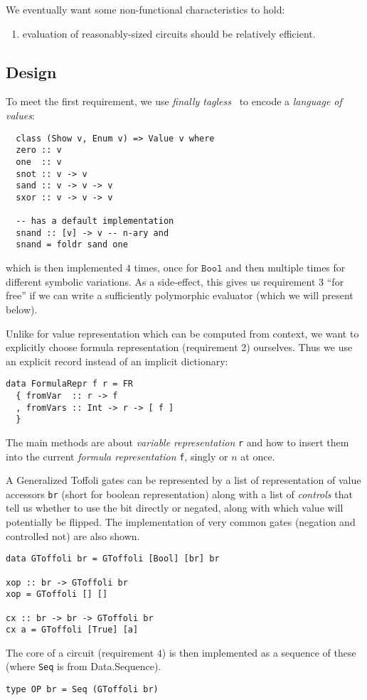 \documentclass[sigplan]{acmart}
\begin{document}
We eventually want some non-functional characteristics to hold:
\begin{enumerate}[resume]
  \item evaluation of reasonably-sized circuits should be relatively efficient.
\end{enumerate}

\subsection{Design}

To meet the first requirement, we use \emph{finally tagless}~\cite{tagless}
to encode a \emph{language of values}:
\begin{verbatim}
  class (Show v, Enum v) => Value v where
  zero :: v
  one  :: v
  snot :: v -> v
  sand :: v -> v -> v
  sxor :: v -> v -> v

  -- has a default implementation
  snand :: [v] -> v -- n-ary and
  snand = foldr sand one
\end{verbatim}
\noindent which is then implemented $4$ times, once for $\texttt{Bool}$
and then multiple times for different symbolic variations. As a side-effect,
this gives us requirement $3$ ``for free'' if we can write a sufficiently
polymorphic evaluator (which we will present below).

Unlike for value representation which can be computed from context, we want
to explicitly choose formula representation (requirement 2) ourselves. Thus we
use an explicit record instead of an implicit dictionary:
\begin{verbatim}
data FormulaRepr f r = FR 
  { fromVar  :: r -> f
  , fromVars :: Int -> r -> [ f ]
  }
\end{verbatim}
\noindent The main methods are about \emph{variable representation} \texttt{r}
and how to insert them into the current \emph{formula representation} \texttt{f},
singly or $n$ at once.

A Generalized Toffoli gates can be represented by a list of representation of
value accessors \texttt{br} (short for boolean representation) along with a list
of \emph{controls} that tell us whether to use the bit directly or negated,
along with which value will potentially be flipped. The implementation of very 
common gates (negation and controlled not) are also shown.
\begin{verbatim}
data GToffoli br = GToffoli [Bool] [br] br

xop :: br -> GToffoli br
xop = GToffoli [] []

cx :: br -> br -> GToffoli br
cx a = GToffoli [True] [a]
\end{verbatim}
\noindent The core of a circuit (requirement $4$) is then implemented as a 
sequence of these (where \texttt{Seq} is from {Data.Sequence}).
\begin{verbatim}
type OP br = Seq (GToffoli br)
\end{verbatim}
\end{document}
